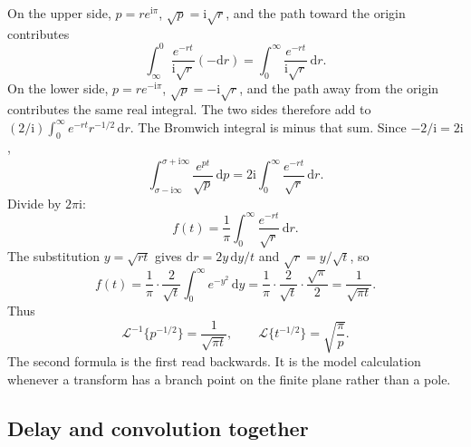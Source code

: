 On the upper side, $p=re^{\mathrm{i}\pi}$, $\sqrt{p}=\mathrm{i}\sqrt{r}$, and the path toward the origin contributes
\begin{equation}
\int_{\infty}^{0}\frac{e^{-rt}}{\mathrm{i}\sqrt{r}}(-\mathrm{d}r)
=\int_0^{\infty}\frac{e^{-rt}}{\mathrm{i}\sqrt{r}}\,\mathrm{d}r.
\end{equation}
On the lower side, $p=re^{-\mathrm{i}\pi}$, $\sqrt{p}=-\mathrm{i}\sqrt{r}$, and the path away from the origin contributes the same real integral. The two sides therefore add to $(2/\mathrm{i})\int_0^{\infty}e^{-rt}r^{-1/2}\,\mathrm{d}r$. The Bromwich integral is minus that sum. Since $-2/\mathrm{i}=2\mathrm{i}$,
\begin{equation}
\int_{\sigma-\mathrm{i}\infty}^{\sigma+\mathrm{i}\infty}\frac{e^{pt}}{\sqrt{p}}\,\mathrm{d}p
=2\mathrm{i}\int_0^{\infty}\frac{e^{-rt}}{\sqrt{r}}\,\mathrm{d}r.
\end{equation}
Divide by $2\pi\mathrm{i}$:
\begin{equation}
f(t)=\frac{1}{\pi}\int_0^{\infty}\frac{e^{-rt}}{\sqrt{r}}\,\mathrm{d}r.
\end{equation}
The substitution $y=\sqrt{rt}$ gives $\mathrm{d}r=2y\,\mathrm{d}y/t$ and $\sqrt{r}=y/\sqrt{t}$, so
\begin{equation}
f(t)=\frac{1}{\pi}\cdot\frac{2}{\sqrt{t}}\int_0^{\infty}e^{-y^2}\,\mathrm{d}y
=\frac{1}{\pi}\cdot\frac{2}{\sqrt{t}}\cdot\frac{\sqrt{\pi}}{2}
=\frac{1}{\sqrt{\pi t}}.
\end{equation}
Thus
\begin{equation}
\mathcal{L}^{-1}\{p^{-1/2}\}=\frac{1}{\sqrt{\pi t}},
\qquad
\mathcal{L}\{t^{-1/2}\}=\sqrt{\frac{\pi}{p}}.
\label{eq:ch06-sqrt}
\end{equation}
The second formula is the first read backwards. It is the model calculation whenever a transform has a branch point on the finite plane rather than a pole.

\subsection{Delay and convolution together}

